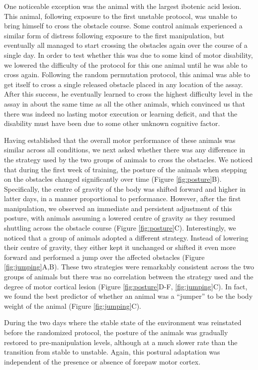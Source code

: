 One noticeable exception was the animal with the largest ibotenic acid lesion. This animal, following exposure to the first unstable protocol, was unable to bring himself to cross the obstacle course. Some control animals experienced a similar form of distress following exposure to the first manipulation, but eventually all managed to start crossing the obstacles again over the course of a single day. In order to test whether this was due to some kind of motor disability, we lowered the difficulty of the protocol for this one animal until he was able to cross again. Following the random permutation protocol, this animal was able to get itself to cross a single released obstacle placed in any location of the assay. After this success, he eventually learned to cross the highest difficulty level in the assay in about the same time as all the other animals, which convinced us that there was indeed no lasting motor execution or learning deficit, and that the disability must have been due to some other unknown cognitive factor. 

Having established that the overall motor performance of these animals was similar across all conditions, we next asked whether there was any difference in the strategy used by the two groups of animals to cross the obstacles. We noticed that during the first week of training, the posture of the animals when stepping on the obstacles changed significantly over time (Figure \ref{fig:posture}B). Specifically, the centre of gravity of the body was shifted forward and higher in latter days, in a manner proportional to performance. However, after the first manipulation, we observed an immediate and persistent adjustment of this posture, with animals assuming a lowered centre of gravity as they resumed shuttling across the obstacle course (Figure \ref{fig:posture}C). Interestingly, we noticed that a group of animals adopted a different strategy. Instead of lowering their centre of gravity, they either kept it unchanged or shifted it even more forward and performed a jump over the affected obstacles (Figure \ref{fig:jumping}A,B). These two strategies were remarkably consistent across the two groups of animals but there was no correlation between the strategy used and the degree of motor cortical lesion (Figure \ref{fig:posture}D-F, \ref{fig:jumping}C). In fact, we found the best predictor of whether an animal was a ``jumper'' to be the body weight of the animal (Figure \ref{fig:jumping}C).

During the two days where the stable state of the environment was reinstated before the randomized protocol, the posture of the animals was gradually restored to pre-manipulation levels, although at a much slower rate than the transition from stable to unstable. Again, this postural adaptation was independent of the presence or absence of forepaw motor cortex.


